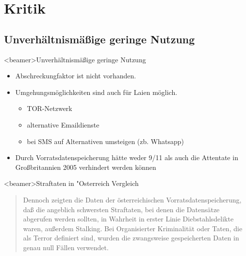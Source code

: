 \section{Kritik}
  \subsection*{Unverhältnismäßige geringe Nutzung}
    \begin{frame}<beamer>{Unverhältnismäßige geringe Nutzung}
      \begin{itemize}
        \item
          Abschreckungfaktor ist nicht vorhanden.
        \item
         Umgehungsmöglichkeiten sind auch für Laien möglich.
        \begin{itemize}
          \item TOR-Netzwerk
          \item alternative Emaildienste
          \item bei SMS auf Alternativen umsteigen (zb. Whatsapp)
        \end{itemize}
        \item Durch Vorratsdatenspeicherung hätte weder 9/11 als auch die Attentate in Großbritannien 2005 verhindert werden können
      \end{itemize}
    \end{frame}

    \begin{frame}<beamer>{Straftaten in "Osterreich Vergleich}
      \begin{quote}
        Dennoch zeigten die Daten der österreichischen Vorratsdatenspeicherung, daß die angeblich schwersten Straftaten, bei denen die Datensätze abgerufen werden sollten, in Wahrheit in erster Linie Diebstahlsdelikte waren, außerdem Stalking. Bei Organisierter Kriminalität oder Taten, die als Terror definiert sind, wurden die zwangsweise gespeicherten Daten in genau null Fällen verwendet.

      \end{quote}
    \end{frame}

